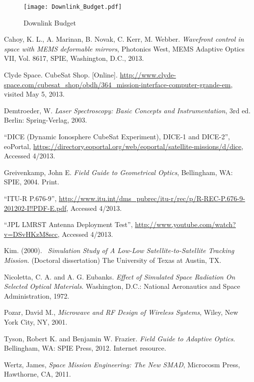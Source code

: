 \documentclass[12pt]{article}
\begin{document}
\newpage

\begin{figure}[ht]
\centering 
\caption{Downlink Budget}
\texttt{[image: Downlink\_Budget.pdf]}
\end{figure}


\newpage

\begin{thebibliography}{9}


   Cahoy, K. L., A. Marinan, B. Novak, C. Kerr, M. Webber. 
   \emph{Wavefront control in space with MEMS deformable mirrors}, Photonics West, MEMS Adaptive Optics VII, Vol. 8617, SPIE, Washington, D.C., 2013.

Clyde Space. CubeSat Shop. [Online]. \url{http://www.clyde-space.com/cubesat_shop/obdh/364_mission-interface-computer-grande-em}, visited May 5, 2013. 
 
   Demtroeder, W.
   \emph{Laser Spectroscopy: Basic Concepts and Instrumentation}, 3rd ed. Berlin: Spring-Verlag, 2003.

“DICE (Dynamic Ionosphere CubeSat Experiment), DICE-1 and DICE-2”, eoPortal, \url{https://directory.eoportal.org/web/eoportal/satellite-missions/d/dice}, Accessed 4/2013.

   Greivenkamp, John E. 
   \emph{Field Guide to Geometrical Optics}, Bellingham, WA: SPIE, 2004. Print.

“ITU-R P.676-9”, \url{http://www.itu.int/dms_pubrec/itu-r/rec/p/R-REC-P.676-9-201202-I!!PDF-E.pdf}, Accessed 4/2013.

“JPL LMRST Antenna Deployment Test”, \url{http://www.youtube.com/watch?v=DSvHKzM8scc}, Accessed 4/2013.

   Kim. (2000).
  \emph{\ Simulation Study of A Low-Low Satellite-to-Satellite Tracking Mission}. (Doctoral dissertation)
  The University of Texas at Austin, TX.

   Nicoletta, C. A. and A. G. Eubanks.
   \emph{Effect of Simulated Space Radiation On Selected Optical Materials}. Washington, D.C.: National Aeronautics and Space Administration, 1972.

Pozar, David M., \emph{Microwave and RF Design of Wireless Systems}, Wiley, New York City, NY, 2001.

   Tyson, Robert K. and Benjamin W. Frazier. 
   \emph{Field Guide to Adaptive Optics}. Bellingham, WA: SPIE Press, 2012.  Internet resource.

Wertz, James, \emph{Space Mission Engineering: The New SMAD}, Microcosm Press, Hawthorne, CA, 2011.


\end{thebibliography}
\end{document}
